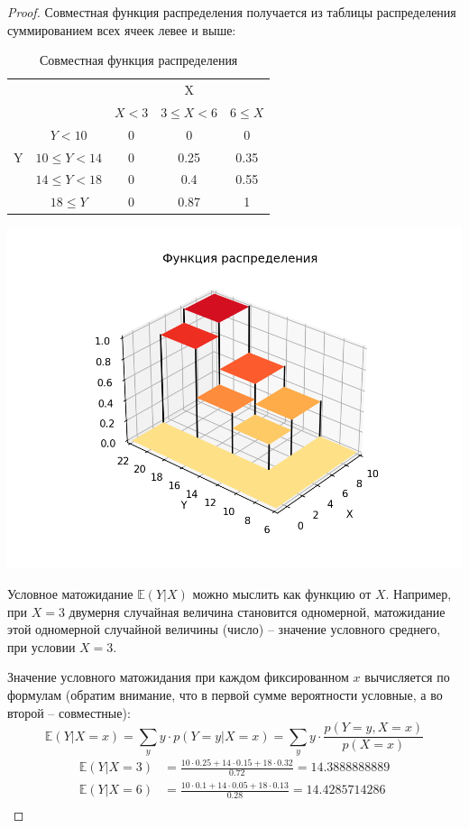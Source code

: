 \documentclass[a4paper,12pt]{article}
\newenvironment{solution}{\renewcommand{\proofname}{\unskip\indent\nopunct}\begin{proof}}{\end{proof}}
\begin{document}
\begin{solution}
Совместная функция распределения получается из таблицы распределения суммированием всех ячеек левее и выше:

\begin{table}[h!]
    \centering
    \begin{tabular}{|c|c|c|c|c|}
        \hline
        \multicolumn{2}{|c|}{} & \multicolumn{3}{c|}{X} \\
        \cline{3-5}
        \multicolumn{2}{|c|}{} & $X<3$ & $3 \le X<6$ & $6 \le X$ \\
        \hline
        \multirow{3}{*}{Y} & $Y<10$    & 0 & 0 & 0 \\ \cline{2-5}
                           & $10 \le Y<14$ & 0 & 0.25 & 0.35 \\ \cline{2-5}
                           & $14 \le Y<18$ & 0 & 0.4 & 0.55 \\ \cline{2-5}
                           & $18 \le Y$    & 0 & 0.87 & 1 \\
        \hline
    \end{tabular}
    \caption{Совместная функция распределения}
\end{table}

\includegraphics[width=\textwidth]{hw_6.png}

Условное матожидание $\mathbb E(Y | X)$ можно мыслить как функцию от $X$.
Например, при $X=3$ двумерня случайная величина становится одномерной, матожидание этой одномерной случайной величины (число) -- значение условного среднего, при условии $X=3$.

Значение условного матожидания при каждом фиксированном $x$ вычисляется по формулам (обратим внимание, что в первой сумме вероятности условные, а во второй -- совместные):
\[
    \mathbb E(Y | X = x) = \sum_y y \cdot p(Y = y | X = x) = \sum_y y \cdot \frac{p(Y = y, X = x)}{p(X = x)}
\]
\begin{align*}
    \mathbb E(Y | X = 3) &= \frac{10 \cdot 0.25 + 14 \cdot 0.15 + 18 \cdot 0.32}{0.72} = 14.3888888889 \\
    \mathbb E(Y | X = 6) &= \frac{10 \cdot 0.1 + 14 \cdot 0.05 + 18 \cdot 0.13}{0.28} = 14.4285714286 \\
\end{align*}

\end{solution}
\end{document}
